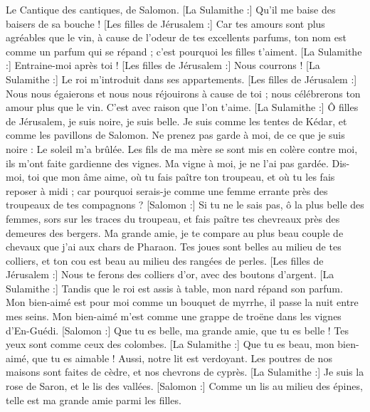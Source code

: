 \begin{multicols}{2}
\VerseOne{}Le Cantique des cantiques, de Salomon.
[La Sulamithe :] Qu'il me baise des baisers de sa bouche ! [Les filles de Jérusalem :] Car tes amours sont plus agréables que le vin,
à cause de l'odeur de tes excellents parfums, ton nom est comme un parfum qui se répand ; c'est pourquoi les filles t'aiment.
[La Sulamithe :] Entraine-moi après toi ! [Les filles de Jérusalem :] Nous courrons ! [La Sulamithe :] Le roi m'introduit dans ses appartements. [Les filles de Jérusalem :] Nous nous égaierons et nous nous réjouirons à cause de toi ; nous célébrerons ton amour plus que le vin. C’est avec raison que l’on t’aime.
[La Sulamithe :] Ô filles de Jérusalem, je suis noire, je suis belle. Je suis comme les tentes de Kédar, et comme les pavillons de Salomon.
Ne prenez pas garde à moi, de ce que je suis noire : Le soleil m'a brûlée. Les fils de ma mère se sont mis en colère contre moi, ils m'ont faite gardienne des vignes. Ma vigne à moi, je ne l’ai pas gardée.
Dis-moi, toi que mon âme aime, où tu fais paître ton troupeau, et où tu les fais reposer à midi ; car pourquoi serais-je comme une femme errante près des troupeaux de tes compagnons ?
[Salomon :] Si tu ne le sais pas, ô la plus belle des femmes, sors sur les traces du troupeau, et fais paître tes chevreaux près des demeures des bergers.
Ma grande amie, je te compare au plus beau couple de chevaux que j'ai aux chars de Pharaon.
Tes joues sont belles au milieu de tes colliers, et ton cou est beau au milieu des rangées de perles.
[Les filles de Jérusalem :] Nous te ferons des colliers d'or, avec des boutons d'argent.
[La Sulamithe :] Tandis que le roi est assis à table, mon nard répand son parfum.
Mon bien-aimé est pour moi comme un bouquet de myrrhe, il passe la nuit entre mes seins.
Mon bien-aimé m'est comme une grappe de troëne dans les vignes d'En-Guédi.
[Salomon :] Que tu es belle, ma grande amie, que tu es belle ! Tes yeux sont comme ceux des colombes.
[La Sulamithe :] Que tu es beau, mon bien-aimé, que tu es aimable ! Aussi, notre lit est verdoyant.
Les poutres de nos maisons sont faites de cèdre, et nos chevrons de cyprès.
\VerseOne{}[La Sulamithe :] Je suis la rose de Saron, et le lis des vallées.
[Salomon :] Comme un lis au milieu des épines, telle est ma grande amie parmi les filles.

\end{multicols}
